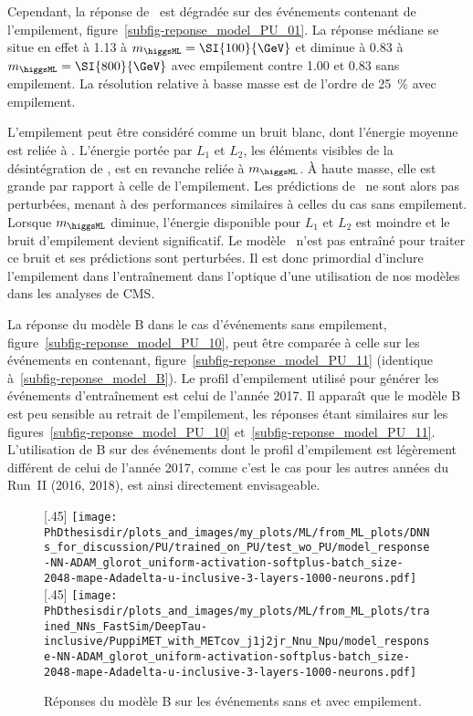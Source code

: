 \par
Cependant, la réponse de \Bnpu\ est dégradée sur des événements contenant de l'empilement, figure~\ref{subfig-reponse_model_PU_01}.
La réponse médiane se situe en effet à \num{1.13} à $m_{\higgsML}=\SI{100}{\GeV}$ et diminue à \num{0.83} à $m_{\higgsML}=\SI{800}{\GeV}$ avec empilement contre \num{1.00} et \num{0.83} sans empilement.
La résolution relative à basse masse est de l'ordre de \SI{25}{\%} avec empilement.
\par
L'empilement peut être considéré comme un bruit blanc, dont l'énergie moyenne est reliée à \Npu.
L'énergie portée par $L_1$ et $L_2$, les éléments visibles de la désintégration de \higgsML,
est en revanche reliée à $m_{\higgsML}$.
À haute masse, elle est grande par rapport à celle de l'empilement.
Les prédictions de \Bnpu\ ne sont alors pas perturbées,
menant à des performances similaires à celles du cas sans empilement.
Lorsque $m_{\higgsML}$ diminue,
l'énergie disponible pour $L_1$ et $L_2$ est moindre
et
le bruit d'empilement devient significatif.
Le modèle \Bnpu\ n'est pas entraîné pour traiter ce bruit et ses prédictions sont perturbées.
Il est donc primordial d'inclure l'empilement dans l'entraînement dans l'optique d'une utilisation de nos modèles dans les analyses de CMS.
\par
La réponse du modèle B
dans le cas d'événements sans empilement, figure~\ref{subfig-reponse_model_PU_10},
peut être comparée
à celle sur les événements en contenant, figure~\ref{subfig-reponse_model_PU_11} (identique à~\ref{subfig-reponse_model_B}).
Le profil d'empilement utilisé pour générer les événements d'entraînement est celui de l'année 2017.
Il apparaît que le modèle B est peu sensible au retrait de l'empilement, les réponses étant similaires sur les figures~\ref{subfig-reponse_model_PU_10} et~\ref{subfig-reponse_model_PU_11}.
L'utilisation de B sur des événements dont le profil d'empilement est légèrement différent de celui de l'année 2017,
comme c'est le cas pour les autres années du Run~II (2016, 2018),
est ainsi directement envisageable.
\begin{figure}[h]
\centering

[.45\textwidth]
{\texttt{[image: \\PhDthesisdir/plots\_and\_images/my\_plots/ML/from\_ML\_plots/DNNs\_for\_discussion/PU/trained\_on\_PU/test\_wo\_PU/model\_response-NN-ADAM\_glorot\_uniform-activation-softplus-batch\_size-2048-mape-Adadelta-u-inclusive-3-layers-1000-neurons.pdf]}\vspace{-.5\baselineskip}}
\hfill
{}[.45\textwidth]
{\texttt{[image: \\PhDthesisdir/plots\_and\_images/my\_plots/ML/from\_ML\_plots/trained\_NNs\_FastSim/DeepTau-inclusive/PuppiMET\_with\_METcov\_j1j2jr\_Nnu\_Npu/model\_response-NN-ADAM\_glorot\_uniform-activation-softplus-batch\_size-2048-mape-Adadelta-u-inclusive-3-layers-1000-neurons.pdf]}\vspace{-.5\baselineskip}}

\caption{Réponses du modèle B sur les événements sans et avec empilement.}
\label{fig-reponse_model_1PU}
\end{figure}
